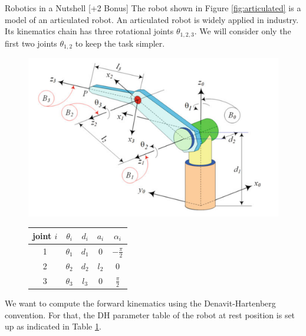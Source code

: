 \documentclass[
	ngerman,
	points=true,%
	]{tudaexercise}
\begin{document}
\begin{task}[points=12]{Robotics in a Nutshell [+2 Bonus]} %
    The robot shown in Figure \ref{fig:articulated} is a model of an articulated robot. An articulated robot is widely applied in industry. Its kinematics chain has three rotational joints $\theta_{1, 2, 3}$. We will consider only the first two joints $\theta_{1,2}$ to keep the task simpler.
    
    \begin{figure}[h]
        \begin{minipage}[b]{0.45\textwidth}
            \includegraphics[width=\textwidth]{figures/articulated_arm.png}
            \label{fig:articulated}
        \end{minipage}
        \hfill
        \begin{minipage}[b]{0.5\textwidth}
            \begin{tabular}{ c | c c c c }
                joint $i$ & $\theta_i$ & $d_i$ & $a_i$ & $\alpha_i$ \\ \hline
                1 & $\theta_1$ & $d_1$ & 0 & $- \frac{\pi}{2}$ \\
                2 & $\theta_2$ & $d_2$ &  $l_2$ & 0 \\
                3 & $\theta_3$ & $l_3$ &  0 & $\frac{\pi}{2}$ \\
            \end{tabular}
            \label{tab:dhparam}
        \end{minipage}
    \end{figure}

    We want to compute the forward kinematics using the Denavit-Hartenberg convention. For that, the DH parameter table of the robot at rest position is set up as indicated in Table \ref{tab:dhparam}.


\end{task}
\end{document}
